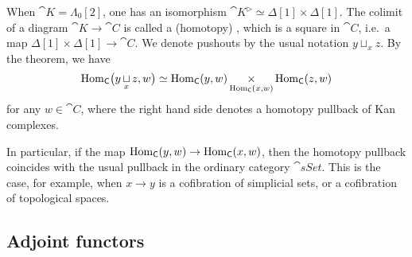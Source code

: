 \begin{example}
    When $\cat K=\Lambda_0[2]$, one has an isomorphism
    $\cat K^\vartriangleright\simeq\Delta[1]\times\Delta[1]$.
    The colimit of a diagram $\cat K\to\cat C$ is called a (homotopy) ,
    which is a square in $\cat C$, i.e.\ a map $\Delta[1]\times\Delta[1]\to\cat C$.
    We denote pushouts by the usual notation $y\sqcup_xz$.
    By the theorem, we have 
    \[ \operatorname{Hom}_{\mathsf{C}}\bigl(y\mathop{\sqcup}_xz,w\bigr)\simeq
    \operatorname{Hom}_{\mathsf{C}}(y,w)\mathop{\times}_{\operatorname{Hom}_{\mathsf{C}}(x,w)}\operatorname{Hom}_{\mathsf{C}}(z,w) \]
    for any $w\in\cat C$,
    where the right hand side denotes a homotopy pullback of Kan complexes. 
    
    In particular, if the map $\operatorname{Hom}_{\mathsf{C}}(y,w)\to \operatorname{Hom}_{\mathsf{C}}(x,w)$,
    then the homotopy pullback coincides with the usual pullback in the ordinary category $\cat{sSet}$.
    This is the case, for example,
    when $x\to y$ is a cofibration of simplicial sets,
    or a cofibration of topological spaces.
    \varqed
\end{example}

\subsection{Adjoint functors}

\nyw

